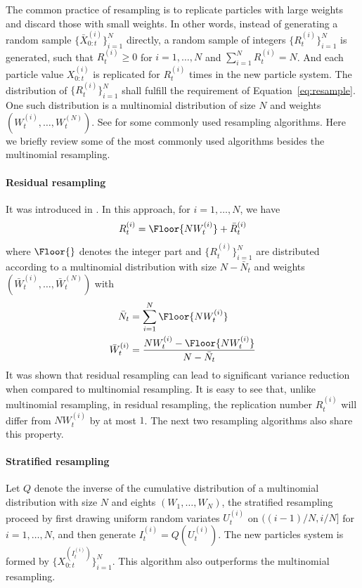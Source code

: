 The common practice of resampling is to replicate particles with large weights
and discard those with small weights. In other words, instead of generating a
random sample $\{\bar{X}_{0:t}^{(i)}\}_{i=1}^N$ directly, a random sample of
integers $\{R_t^{(i)}\}_{i=1}^N$ is generated, such that $R_t^{(i)} \ge 0$ for
$i = 1,\dots,N$ and $\sum_{i=1}^N R_t^{(i)} = N$. And each particle value
$X_{0:t}^{(i)}$ is replicated for $R_t^{(i)}$ times in the new particle
system.  The distribution of $\{R_t^{(i)}\}_{i=1}^N$ shall fulfill the
requirement of Equation~\ref{eq:resample}. One such distribution is a
multinomial distribution of size $N$ and weights
$(W_t^{(i)},\dots,W_t^{(N)})$. See \cite{Douc:2005wa} for some commonly used
resampling algorithms. Here we briefly review some of the most commonly used
algorithms besides the multinomial resampling.

\paragraph{Residual resampling} It was introduced in \cite{Liu:1998iu}. In
this approach, for $i = 1,\dots,N$, we have
\begin{equation}
  R_t^{(i)} = \Floor{NW_t^{(i)}} + \bar{R}_t^{(i)}
\end{equation}
where $\Floor{}$ denotes the integer part and $\{R_t^{(i)}\}_{i=1}^N$ are
distributed according to a multinomial distribution with size $N - \bar{N}_t$
and weights $(\bar{W}_t^{(i)},\dots,\bar{W}_t^{(N)})$ with
\begin{align*}
  \bar{N}_t &= \sum_{i=1}^N\Floor{NW_t^{(i)}} \\
  \bar{W}_t^{(i)} &= \frac{NW_t^{(i)} - \Floor{NW_t^{(i)}}}{N - \bar{N}_t}
\end{align*}
It was shown that residual resampling can lead to significant variance
reduction when compared to multinomial resampling. It is easy to see that,
unlike multinomial resampling, in residual resampling, the replication number
$R_t^{(i)}$ will differ from $NW_t^{(i)}$ by at most $1$. The next two
resampling algorithms also share this property.

\paragraph{Stratified resampling} Let $Q$ denote the inverse of the cumulative
distribution of a multinomial distribution with size $N$ and eights
$(W_1,\dots,W_N)$, the stratified resampling proceed by first drawing uniform
random variates $U_t^{(i)}$ on $((i-1)/N, i/N]$ for $i = 1,\dots,N$, and then
generate $I_t^{(i)} = Q(U_t^{(i)})$. The new particles system is formed by
$\{X_{0:t}^{(I_t^{(i)})}\}_{i=1}^N$.  This algorithm also outperforms the
multinomial resampling.


